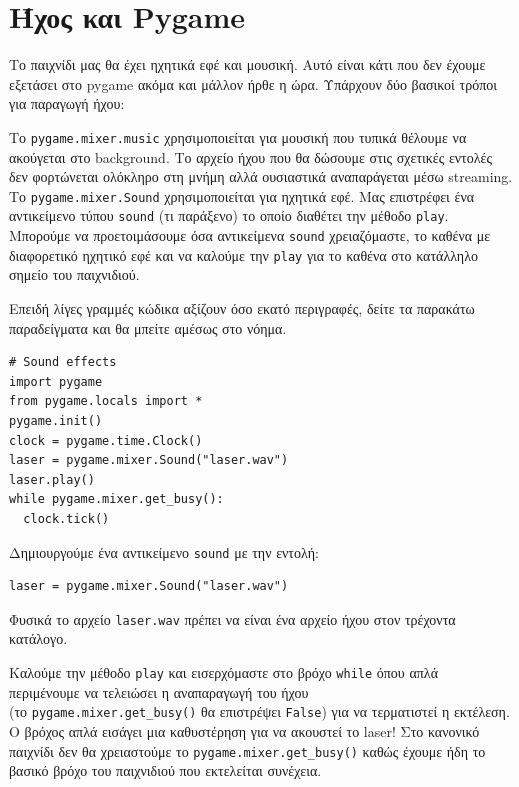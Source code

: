 \section{Ήχος και Pygame}

Το παιχνίδι μας θα έχει ηχητικά εφέ και μουσική. Αυτό είναι κάτι που δεν έχουμε εξετάσει στο pygame ακόμα και μάλλον ήρθε η ώρα. Υπάρχουν δύο βασικοί τρόποι για παραγωγή ήχου:

Το {\tt pygame.mixer.music} χρησιμοποιείται για μουσική που τυπικά θέλουμε να ακούγεται στο background. Το αρχείο ήχου που θα δώσουμε στις σχετικές εντολές δεν φορτώνεται ολόκληρο στη μνήμη αλλά ουσιαστικά αναπαράγεται μέσω streaming.
Το {\tt pygame.mixer.Sound} χρησιμοποιείται για ηχητικά εφέ. Μας επιστρέφει ένα αντικείμενο τύπου {\tt sound} (τι παράξενο) το οποίο διαθέτει την μέθοδο {\tt play}. Μπορούμε να προετοιμάσουμε όσα αντικείμενα {\tt sound} χρειαζόμαστε, το καθένα με διαφορετικό ηχητικό εφέ και να καλούμε την {\tt play} για το καθένα στο κατάλληλο σημείο του παιχνιδιού.

Επειδή λίγες γραμμές κώδικα αξίζουν όσο εκατό περιγραφές, δείτε τα παρακάτω παραδείγματα και θα μπείτε αμέσως στο νόημα.

\begin{verbatim}
# Sound effects
import pygame
from pygame.locals import *
pygame.init()
clock = pygame.time.Clock()
laser = pygame.mixer.Sound("laser.wav")
laser.play()
while pygame.mixer.get_busy():
  clock.tick()
\end{verbatim}

Δημιουργούμε ένα αντικείμενο {\tt sound} με την εντολή:

\begin{verbatim}
laser = pygame.mixer.Sound("laser.wav")
\end{verbatim}

Φυσικά το αρχείο {\tt laser.wav} πρέπει να είναι ένα αρχείο ήχου στον τρέχοντα κατάλογο.

Καλούμε την μέθοδο {\tt play} και εισερχόμαστε στο βρόχο {\tt while} όπου απλά
περιμένουμε να τελειώσει η αναπαραγωγή του ήχου\\
(το {\tt pygame.mixer.get\_busy()}
θα επιστρέψει {\tt False}) για να τερματιστεί η εκτέλεση. Ο βρόχος απλά εισάγει
μια καθυστέρηση για να ακουστεί το laser! Στο κανονικό παιχνίδι δεν θα
χρειαστούμε το {\tt pygame.mixer.get\_busy()} καθώς έχουμε ήδη το βασικό βρόχο του παιχνιδιού που εκτελείται συνέχεια.

